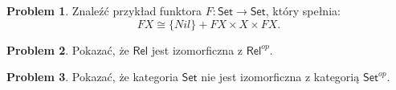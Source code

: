 \documentclass[10pt]{amsart}
\theoremstyle{plain}
\theoremstyle{definition}
\newtheorem{problem}{Problem}
\numberwithin{equation}{section}
\begin{document}
\begin{problem}
Znaleźć przykład funktora $F:\mathsf{Set}\to\mathsf{Set}$, który spełnia:
$$
FX \cong \{Nil\} + FX \times X \times FX.
$$
\end{problem}

\begin{problem}
Pokazać, że $\mathsf{Rel}$ jest izomorficzna z $\mathsf{Rel}^{op}$. 
\end{problem}


\begin{problem}
Pokazać, że kategoria $\mathsf{Set}$ nie jest izomorficzna z kategorią $\mathsf{Set}^{op}$. 
\end{problem}
%
%
%
%
%
%
%
\end{document}
